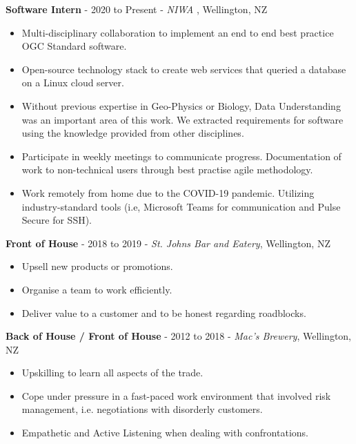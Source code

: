 \documentclass[9pt]{developercv}
\begin{document}


\textbf{Software Intern} - 2020 to Present - \emph{NIWA} , Wellington, NZ
\begin{itemize}
	\item Multi-disciplinary collaboration to implement an end to end best practice OGC Standard software.
	\item Open-source technology stack to create web services that queried a database on a Linux cloud server.
	\item Without previous expertise in Geo-Physics or Biology, Data Understanding was an important area of this work. We extracted requirements for software using the knowledge provided from other disciplines.
	\item Participate in weekly meetings to communicate progress. Documentation of work to non-technical users through best practise agile methodology.
	\item Work remotely from home due to the COVID-19 pandemic. Utilizing industry-standard tools (i.e, Microsoft Teams for communication and Pulse Secure for SSH).
\end{itemize}

\textbf{Front of House} - 2018 to 2019 - \emph{St. Johns Bar and Eatery}, Wellington, NZ
\begin{itemize}
	\item Upsell new products or promotions.
	\item Organise a team to work efficiently.
	\item Deliver value to a customer and to be honest regarding roadblocks.
\end{itemize}

\textbf{Back of House / Front of House} - 2012 to 2018 - \emph{Mac's Brewery}, Wellington, NZ
\begin{itemize}
	\item Upskilling to learn all aspects of the trade.
	\item Cope under pressure in a fast-paced work environment that involved risk management, i.e. negotiations with disorderly customers.
	\item Empathetic and Active Listening when dealing with confrontations.
\end{itemize}
\end{document}
